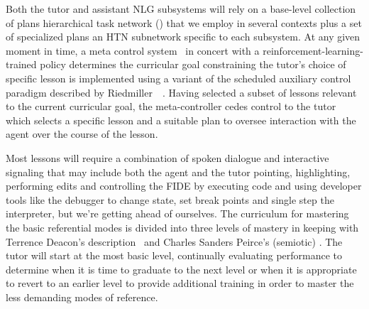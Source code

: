 Both the tutor and assistant NLG subsystems will rely on a base-level collection of plans \emdash{} hierarchical task network ({}) \emdash{} that we employ in several contexts plus a set of specialized plans \emdash{} an HTN subnetwork \emdash{} specific to each subsystem. At any given moment in time, a meta control system~\cite{HamricketalCoRR-17} in concert with a reinforcement-learning-trained policy determines the curricular goal constraining the tutor's choice of specific lesson is implemented using a variant of the scheduled auxiliary control paradigm described by Riedmiller~\etal{}~\cite{RiedmilleretalCoRR-18}. Having selected a subset of lessons relevant to the current curricular goal, the meta-controller cedes control to the tutor which selects a specific lesson and a suitable plan to oversee interaction with the agent over the course of the lesson.

Most lessons will require a combination of spoken dialogue and interactive signaling that may include both the agent and the tutor pointing, highlighting, performing edits and controlling the FIDE by executing code and using developer tools like the debugger to change state, set break points and single step the interpreter, but we're getting ahead of ourselves. The curriculum for mastering the basic referential modes is divided into three levels of mastery in keeping with Terrence Deacon's description~\cite{Deacon1998symbolic} and Charles Sanders Peirce's (semiotic) {}. The tutor will start at the most basic level, continually evaluating performance to determine when it is time to graduate to the next level or when it is appropriate to revert to an earlier level to provide additional training in order to master the less demanding modes of reference.

